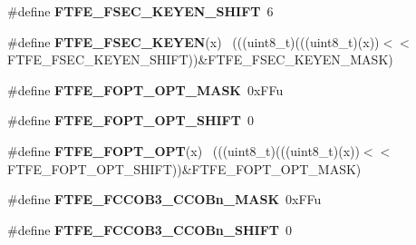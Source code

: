 \begin{DoxyCompactItemize}
\item 
\hypertarget{group___f_t_f_e___register___masks_gacd8d966f0f526c11eec0590854c258be}{}\#define {\bfseries F\+T\+F\+E\+\_\+\+F\+S\+E\+C\+\_\+\+K\+E\+Y\+E\+N\+\_\+\+S\+H\+I\+F\+T}~6\label{group___f_t_f_e___register___masks_gacd8d966f0f526c11eec0590854c258be}

\item 
\hypertarget{group___f_t_f_e___register___masks_ga4ea865f14484044b96ed3a6c2bae671f}{}\#define {\bfseries F\+T\+F\+E\+\_\+\+F\+S\+E\+C\+\_\+\+K\+E\+Y\+E\+N}(x)                                          ~(((uint8\+\_\+t)(((uint8\+\_\+t)(x))$<$$<$F\+T\+F\+E\+\_\+\+F\+S\+E\+C\+\_\+\+K\+E\+Y\+E\+N\+\_\+\+S\+H\+I\+F\+T))\&F\+T\+F\+E\+\_\+\+F\+S\+E\+C\+\_\+\+K\+E\+Y\+E\+N\+\_\+\+M\+A\+S\+K)\label{group___f_t_f_e___register___masks_ga4ea865f14484044b96ed3a6c2bae671f}

\item 
\hypertarget{group___f_t_f_e___register___masks_gafbeb43ee4b3c54b91d39f7ac619c129f}{}\#define {\bfseries F\+T\+F\+E\+\_\+\+F\+O\+P\+T\+\_\+\+O\+P\+T\+\_\+\+M\+A\+S\+K}~0x\+F\+Fu\label{group___f_t_f_e___register___masks_gafbeb43ee4b3c54b91d39f7ac619c129f}

\item 
\hypertarget{group___f_t_f_e___register___masks_gaa36bd1377899a70f05455ce2b627f775}{}\#define {\bfseries F\+T\+F\+E\+\_\+\+F\+O\+P\+T\+\_\+\+O\+P\+T\+\_\+\+S\+H\+I\+F\+T}~0\label{group___f_t_f_e___register___masks_gaa36bd1377899a70f05455ce2b627f775}

\item 
\hypertarget{group___f_t_f_e___register___masks_gaa3f8a7e65bc9238f52c7506d03277f63}{}\#define {\bfseries F\+T\+F\+E\+\_\+\+F\+O\+P\+T\+\_\+\+O\+P\+T}(x)                                              ~(((uint8\+\_\+t)(((uint8\+\_\+t)(x))$<$$<$F\+T\+F\+E\+\_\+\+F\+O\+P\+T\+\_\+\+O\+P\+T\+\_\+\+S\+H\+I\+F\+T))\&F\+T\+F\+E\+\_\+\+F\+O\+P\+T\+\_\+\+O\+P\+T\+\_\+\+M\+A\+S\+K)\label{group___f_t_f_e___register___masks_gaa3f8a7e65bc9238f52c7506d03277f63}

\item 
\hypertarget{group___f_t_f_e___register___masks_ga10bc3ec6bba0545905e9cc4c41264b67}{}\#define {\bfseries F\+T\+F\+E\+\_\+\+F\+C\+C\+O\+B3\+\_\+\+C\+C\+O\+Bn\+\_\+\+M\+A\+S\+K}~0x\+F\+Fu\label{group___f_t_f_e___register___masks_ga10bc3ec6bba0545905e9cc4c41264b67}

\item 
\hypertarget{group___f_t_f_e___register___masks_gad4804cedc12c2c61544737b797081590}{}\#define {\bfseries F\+T\+F\+E\+\_\+\+F\+C\+C\+O\+B3\+\_\+\+C\+C\+O\+Bn\+\_\+\+S\+H\+I\+F\+T}~0\label{group___f_t_f_e___register___masks_gad4804cedc12c2c61544737b797081590}


\end{DoxyCompactItemize}
